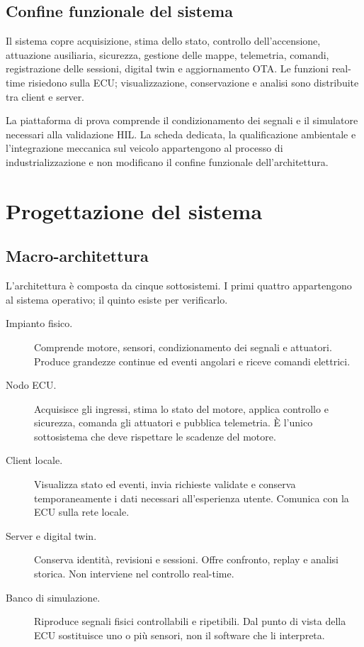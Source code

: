 \documentclass{article}
\begin{document}
\subsection{Confine funzionale del sistema}

Il sistema copre acquisizione, stima dello stato, controllo dell'accensione,
attuazione ausiliaria, sicurezza, gestione delle mappe, telemetria, comandi,
registrazione delle sessioni, digital twin e aggiornamento OTA. Le funzioni
real-time risiedono sulla ECU; visualizzazione, conservazione e analisi sono
distribuite tra client e server.

La piattaforma di prova comprende il condizionamento dei segnali e il simulatore
necessari alla validazione HIL. La scheda dedicata, la qualificazione ambientale
e l'integrazione meccanica sul veicolo appartengono al processo di
industrializzazione e non modificano il confine funzionale dell'architettura.

\section{Progettazione del sistema}
\label{sec:progettazione}

\subsection{Macro-architettura}

L'architettura è composta da cinque sottosistemi. I primi quattro appartengono
al sistema operativo; il quinto esiste per verificarlo.

\begin{description}
    \item[Impianto fisico.] Comprende motore, sensori, condizionamento dei
          segnali e attuatori. Produce grandezze continue ed eventi angolari e
          riceve comandi elettrici.

    \item[Nodo ECU.] Acquisisce gli ingressi, stima lo stato del motore, applica
          controllo e sicurezza, comanda gli attuatori e pubblica telemetria. È
          l'unico sottosistema che deve rispettare le scadenze del motore.

    \item[Client locale.] Visualizza stato ed eventi, invia richieste validate
          e conserva temporaneamente i dati necessari all'esperienza utente.
          Comunica con la ECU sulla rete locale.

    \item[Server e digital twin.] Conserva identità, revisioni e sessioni. Offre
          confronto, replay e analisi storica. Non interviene nel controllo
          real-time.

    \item[Banco di simulazione.] Riproduce segnali fisici controllabili e
          ripetibili. Dal punto di vista della ECU sostituisce uno o più sensori,
          non il software che li interpreta.
\end{description}
\end{document}
